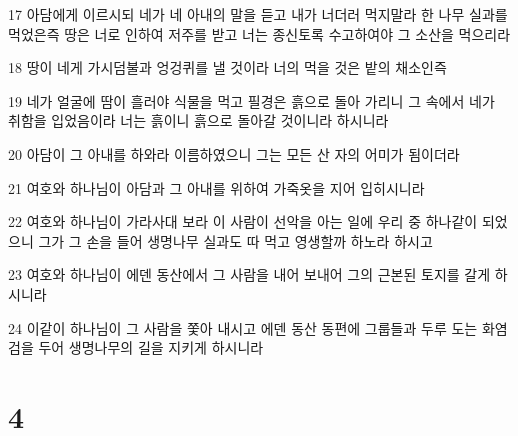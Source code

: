 \par 17 아담에게 이르시되 네가 네 아내의 말을 듣고 내가 너더러 먹지말라 한 나무 실과를 먹었은즉 땅은 너로 인하여 저주를 받고 너는 종신토록 수고하여야 그 소산을 먹으리라
\par 18 땅이 네게 가시덤불과 엉겅퀴를 낼 것이라 너의 먹을 것은 밭의 채소인즉
\par 19 네가 얼굴에 땀이 흘러야 식물을 먹고 필경은 흙으로 돌아 가리니 그 속에서 네가 취함을 입었음이라 너는 흙이니 흙으로 돌아갈 것이니라 하시니라
\par 20 아담이 그 아내를 하와라 이름하였으니 그는 모든 산 자의 어미가 됨이더라
\par 21 여호와 하나님이 아담과 그 아내를 위하여 가죽옷을 지어 입히시니라
\par 22 여호와 하나님이 가라사대 보라 이 사람이 선악을 아는 일에 우리 중 하나같이 되었으니 그가 그 손을 들어 생명나무 실과도 따 먹고 영생할까 하노라 하시고
\par 23 여호와 하나님이 에덴 동산에서 그 사람을 내어 보내어 그의 근본된 토지를 갈게 하시니라
\par 24 이같이 하나님이 그 사람을 쫓아 내시고 에덴 동산 동편에 그룹들과 두루 도는 화염검을 두어 생명나무의 길을 지키게 하시니라

\chapter{4}

